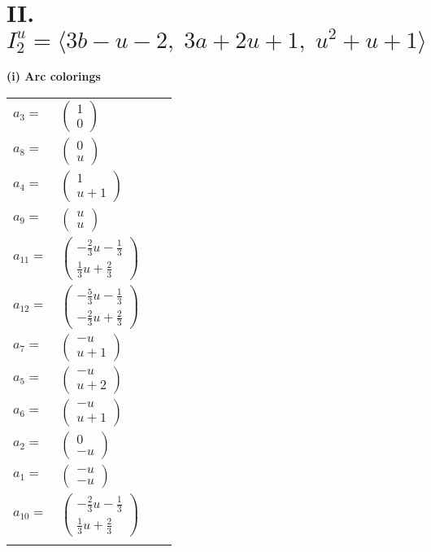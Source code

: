 \documentclass[1p]{elsarticle_modified}
\theoremstyle{definition}
\begin{document}
\centering \section*{II. $I^u_{2}= \langle 3 b- u-2,\;3 a+2 u+1,\;u^2+u+1 \rangle$}
\flushleft \textbf{(i) Arc colorings}\\
\begin{tabular}{m{7pt} m{180pt} m{7pt} m{180pt} }
\flushright $a_{3}=$&$\begin{pmatrix}1\\0\end{pmatrix}$ \\
\flushright $a_{8}=$&$\begin{pmatrix}0\\u\end{pmatrix}$ \\
\flushright $a_{4}=$&$\begin{pmatrix}1\\u+1\end{pmatrix}$ \\
\flushright $a_{9}=$&$\begin{pmatrix}u\\u\end{pmatrix}$ \\
\flushright $a_{11}=$&$\begin{pmatrix}-\frac{2}{3} u-\frac{1}{3}\\\frac{1}{3} u+\frac{2}{3}\end{pmatrix}$ \\
\flushright $a_{12}=$&$\begin{pmatrix}-\frac{5}{3} u-\frac{1}{3}\\-\frac{2}{3} u+\frac{2}{3}\end{pmatrix}$ \\
\flushright $a_{7}=$&$\begin{pmatrix}- u\\u+1\end{pmatrix}$ \\
\flushright $a_{5}=$&$\begin{pmatrix}- u\\u+2\end{pmatrix}$ \\
\flushright $a_{6}=$&$\begin{pmatrix}- u\\u+1\end{pmatrix}$ \\
\flushright $a_{2}=$&$\begin{pmatrix}0\\- u\end{pmatrix}$ \\
\flushright $a_{1}=$&$\begin{pmatrix}- u\\- u\end{pmatrix}$ \\
\flushright $a_{10}=$&$\begin{pmatrix}-\frac{2}{3} u-\frac{1}{3}\\\frac{1}{3} u+\frac{2}{3}\end{pmatrix}$\\&\end{tabular}
\end{document}
